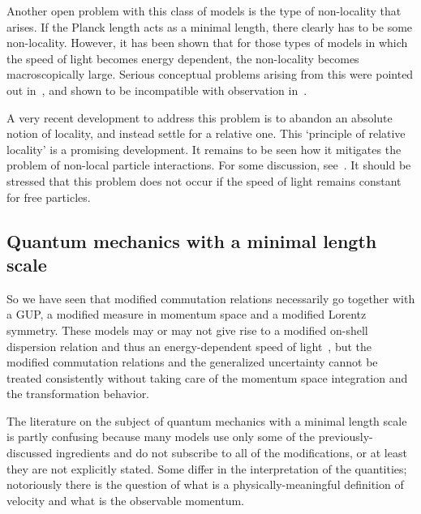 \documentclass{article}
\begin{document}
Another open problem with this class of models is
the type of non-locality that arises. If the Planck length acts as a minimal length,
there clearly has to be some non-locality. However, it has been shown that for those types of
models in which the speed of light becomes energy dependent, the non-locality becomes 
macroscopically large. Serious conceptual problems arising from
this were pointed out in~\cite{AmelinoCamelia:2002vy,Schutzhold:2003yp,Hossenfelder:2006rr}, 
and shown to be incompatible with observation in~\cite{Hossenfelder:2009mu,Hossenfelder:2010tm}. 

A very recent development to
address this problem is to abandon an absolute notion of locality, and instead settle
for a relative one. This `principle of relative locality' 
\cite{Smolin:2010xa,Smolin:2010mx,Jacob:2010vr,AmelinoCamelia:2010qv,AmelinoCamelia:2011bm,AmelinoCamelia:2011yi,Carmona:2011wc}
is a promising development. It remains to be seen how it mitigates the problem of non-local
particle interactions. For some discussion, see~\cite{Hossenfelder:2010yp,Hossenfelder:2010jn,Hossenfelder:2010xr}.
It should be stressed that this problem does not occur if the
speed of light remains constant for free particles. 

\subsection{Quantum mechanics with a minimal length scale}

So we have seen that modified commutation
relations necessarily go together with a GUP, a modified measure 
in momentum space and a modified Lorentz symmetry. These models may or may not give rise to
a modified on-shell dispersion relation and thus an energy-dependent
speed of light~\cite{Hossenfelder:2005ed}, but the modified
commutation relations and the generalized uncertainty cannot be
treated consistently without taking care of the momentum space integration and the transformation behavior. 
 
The literature on the subject of quantum mechanics with a minimal length scale is partly confusing 
because many models use only some of the previously-discussed ingredients and do not 
subscribe to all of the modifications, or at least they are not explicitly stated. Some
differ in the interpretation of the quantities; notoriously there is the question of what is
a physically-meaningful definition of velocity and what is the observable momentum. 
\end{document}
